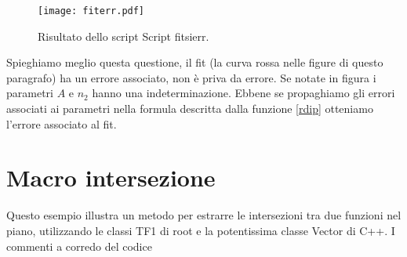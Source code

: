 \documentclass[11pt,fleqn]{book} %
\begin{document}
\begin{figure}[h]
\centering
\texttt{[image: fiterr.pdf]}
\caption{Risultato dello script Script fitsierr. \label{fiterr}}
\end{figure}
Spieghiamo meglio questa questione, il fit (la curva rossa nelle figure di questo paragrafo) ha un errore associato, non è priva da errore. Se notate in figura i parametri $A$ e $n_2$ hanno una indeterminazione. Ebbene se propaghiamo gli errori associati ai parametri nella formula descritta dalla funzione \ref{rdip} otteniamo l'errore associato al fit.
\newpage
\section{Macro intersezione}

Questo esempio illustra un metodo per estrarre le intersezioni tra due funzioni nel piano, utilizzando le classi TF1 di root e la potentissima classe Vector di C++. I commenti a corredo del codice
\end{document}
